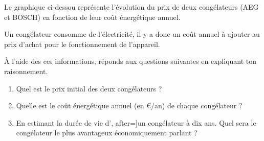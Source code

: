 %
%
    Le graphique ci-dessou représente l'évolution du prix de deux congélateurs (AEG et BOSCH) en fonction de leur coût énergétique annuel.

    Un congélateur consomme de l'électricité, il y a donc un coût annuel à ajouter au prix d'achat pour le fonctionnement de l'appareil.

    À l'aide des ces informations, réponds aux questions suivantes en expliquant ton raisonnement.
    \begin{enumerate}[itemsep=1em]
        \item Quel est le prix initial des deux congélateurs ?
        \item Quelle est le coût énergétique annuel (en €/an) de chaque congélateur ?
        \item En estimant la durée de vie d', after=\vspace*{1em}]un congélateur à dix ans. Quel sera le congélateur le plus avantageux économiquement parlant ?
    \end{enumerate}
    \begin{center}
        
    \end{center}
